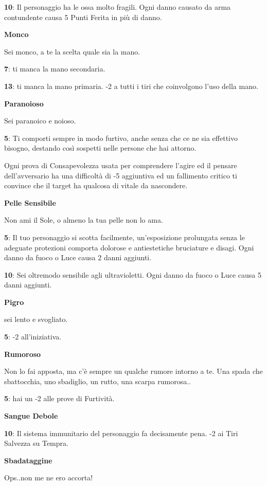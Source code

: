\documentclass[a4paper,twoside,openany]{book}
\begin{document}
\begin{multicols}{2}
\textbf{10}: Il personaggio ha le ossa molto fragili. Ogni danno causato da arma contundente causa 5 Punti Ferita in più di danno.

\textbf{Monco}

Sei monco, a te la scelta quale sia la mano.

\textbf{7}: ti manca la mano secondaria.

\textbf{13}: ti manca la mano primaria. -2 a tutti i tiri che coinvolgono l'uso della mano.

\textbf{Paranoioso}

Sei paranoico e noioso.

\textbf{5}: Ti comporti sempre in modo furtivo, anche senza che ce ne sia effettivo bisogno, destando così sospetti nelle persone che hai attorno.

Ogni prova di Consapevolezza usata per comprendere l'agire ed il pensare dell'avversario ha una difficoltà di -5 aggiuntiva ed un fallimento critico ti convince che il target ha qualcosa di vitale da nascondere.

\textbf{Pelle Sensibile}

Non ami il Sole, o almeno la tua pelle non lo ama.

\textbf{5}: Il tuo personaggio si scotta facilmente, un'esposizione prolungata senza le adeguate protezioni comporta dolorose e antiestetiche bruciature e disagi. Ogni danno da fuoco o Luce causa 2 danni aggiunti.

\textbf{10}: Sei oltremodo sensibile agli ultravioletti. Ogni danno da fuoco o Luce causa 5 danni aggiunti.

\textbf{Pigro}

sei lento e svogliato.

\textbf{5}: -2 all'iniziativa.

\textbf{Rumoroso}

Non lo fai apposta, ma c'è sempre un qualche rumore intorno a te. Una spada che sbattocchia, uno sbadiglio, un rutto, una scarpa rumorosa..

\textbf{5}: hai un -2 alle prove di Furtività.

\textbf{Sangue Debole}

\textbf{10}: Il sistema immunitario del personaggio fa decisamente pena. -2 ai Tiri Salvezza su Tempra.

\textbf{Sbadataggine}

Ops..non me ne ero accorta!


\end{multicols}
\end{document}
